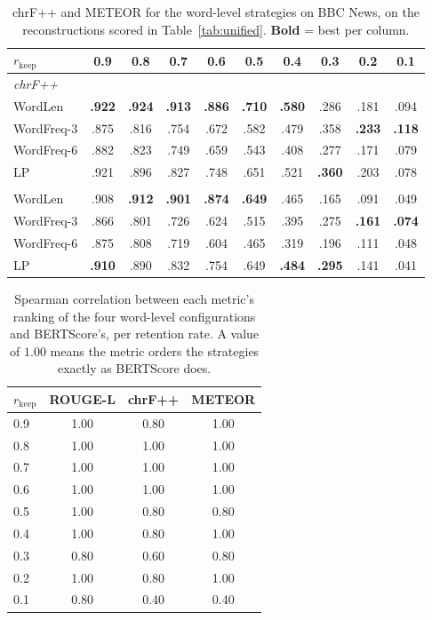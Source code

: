 \documentclass[11pt]{article}
\newcommand{\rkeep}{r_{\mathrm{keep}}}
\begin{document}
\begin{table}[tbp]
\centering
\small
\setlength{\tabcolsep}{4.5pt}
\caption{chrF++ and METEOR for the word-level strategies on BBC News, on the reconstructions scored in
Table~\ref{tab:unified}. \textbf{Bold} = best per column. }
\label{tab:chrf_meteor}
\begin{tabular}{lccccccccc}
\toprule
$\rkeep$ & 0.9 & 0.8 & 0.7 & 0.6 & 0.5 & 0.4 & 0.3 & 0.2 & 0.1 \\
\midrule
\multicolumn{10}{l}{\emph{chrF++}} \\
WordLen            & \textbf{.922} & \textbf{.924} & \textbf{.913} & \textbf{.886} & \textbf{.710} & \textbf{.580} & .286 & .181 & .094 \\
WordFreq-3         & .875 & .816 & .754 & .672 & .582 & .479 & .358 & \textbf{.233} & \textbf{.118} \\
WordFreq-6         & .882 & .823 & .749 & .659 & .543 & .408 & .277 & .171 & .079 \\
LP                 & .921 & .896 & .827 & .748 & .651 & .521 & \textbf{.360} & .203 & .078 \\
\addlinespace[3pt]
\multicolumn{10}{l}{\emph{METEOR}} \\
WordLen            & .908 & \textbf{.912} & \textbf{.901} & \textbf{.874} & \textbf{.649} & .465 & .165 & .091 & .049 \\
WordFreq-3         & .866 & .801 & .726 & .624 & .515 & .395 & .275 & \textbf{.161} & \textbf{.074} \\
WordFreq-6         & .875 & .808 & .719 & .604 & .465 & .319 & .196 & .111 & .048 \\
LP                 & \textbf{.910} & .890 & .832 & .754 & .649 & \textbf{.484} & \textbf{.295} & .141 & .041 \\
\bottomrule
\end{tabular}
\end{table}

\begin{table}[htbp]
\centering
\small
\setlength{\tabcolsep}{4pt}
\caption{Spearman correlation between each metric's ranking of the four word-level configurations and
BERTScore's, per retention rate. A value of $1.00$ means the metric orders the strategies exactly as
BERTScore does.}
\label{tab:rank_stability}
\begin{tabular}{lccc}
\toprule
$\rkeep$ & ROUGE-L & chrF++ & METEOR \\
\midrule
0.9 & 1.00 & 0.80 & 1.00 \\
0.8 & 1.00 & 1.00 & 1.00 \\
0.7 & 1.00 & 1.00 & 1.00 \\
0.6 & 1.00 & 1.00 & 1.00 \\
0.5 & 1.00 & 0.80 & 0.80 \\
0.4 & 1.00 & 0.80 & 1.00 \\
0.3 & 0.80 & 0.60 & 0.80 \\
0.2 & 1.00 & 0.80 & 1.00 \\
0.1 & 0.80 & 0.40 & 0.40 \\
\bottomrule
\end{tabular}
\end{table}
\end{document}
